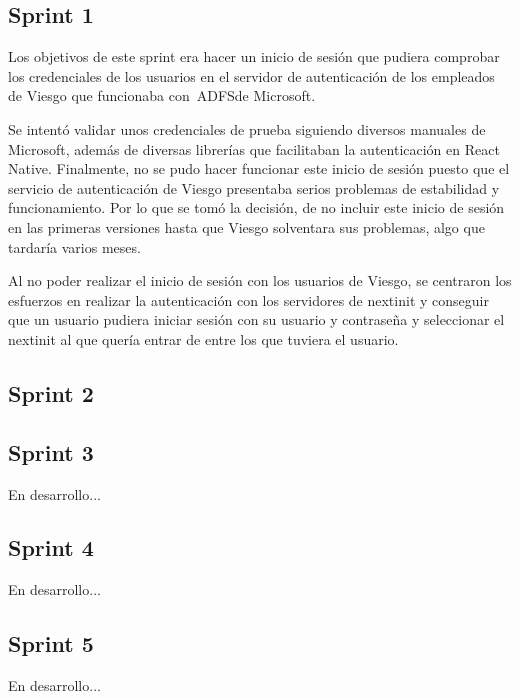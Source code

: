 \subsection{Sprint 1}

Los objetivos de este sprint era hacer un inicio de sesión que pudiera comprobar los credenciales de los
usuarios en el servidor de autenticación de los empleados de Viesgo que funcionaba con~\acf{ADFS}de Microsoft.

Se intentó validar unos credenciales de prueba siguiendo diversos manuales de Microsoft, además de 
diversas librerías que facilitaban la autenticación en React Native. Finalmente, no se pudo hacer funcionar
 este inicio de sesión puesto que el servicio de autenticación de Viesgo presentaba serios problemas de
 estabilidad y funcionamiento. Por lo que se tomó la decisión, de no incluir este inicio de sesión en las 
 primeras versiones hasta que Viesgo solventara sus problemas, algo que tardaría varios meses.

Al no poder realizar el inicio de sesión con los usuarios de Viesgo, se centraron los esfuerzos en realizar
la autenticación con los servidores de nextinit y conseguir que un usuario pudiera iniciar sesión con su 
usuario y contraseña y seleccionar el nextinit al que quería entrar de entre los que tuviera el usuario.

\subsection{Sprint 2}



\subsection{Sprint 3}

En desarrollo...

\subsection{Sprint 4}

En desarrollo...

\subsection{Sprint 5}

En desarrollo...


